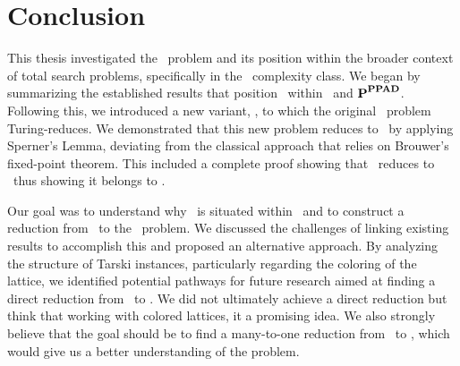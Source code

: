 \chapter{Conclusion}\label{ch:conclusion}

This thesis investigated the \Tarski\ problem and its position within the broader context of total search problems, specifically in the \TFNP\ complexity class. We began by summarizing the established results that position \Tarski\ within \PLS\ and ${\textbf{P}}^{\textbf{PPAD}}$. Following this, we introduced a new variant, \Tarskistar, to which the original \Tarski\ problem Turing-reduces. We demonstrated that this new problem reduces to \EndOfLine\ by applying Sperner's Lemma, deviating from the classical approach that relies on Brouwer's fixed-point theorem. This included a complete proof showing that \Sperner\ reduces to \EndOfLine\ thus showing it belongs to \PPAD\@.

Our goal was to understand why \Tarski\ is situated within \EOPL\ and to construct a reduction from \Tarski\ to the \EndOfPotentialLine\ problem. We discussed the challenges of linking existing results to accomplish this and proposed an alternative approach. By analyzing the structure of Tarski instances, particularly regarding the coloring of the lattice, we identified potential pathways for future research aimed at finding a direct reduction from \Tarski\ to \EndOfPotentialLine. We did not ultimately achieve a direct reduction but think that working with colored lattices, it a promising idea. We also strongly believe that the goal should be to find a many-to-one reduction from \Tarskistar\ to \EndOfPotentialLine\@, which would give us a better understanding of the problem.